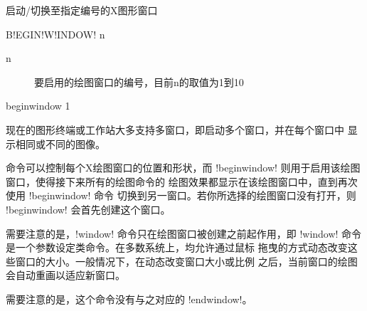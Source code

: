 \label{cmd:beginwindow}

启动/切换至指定编号的X图形窗口

\begin{SACSTX}
B!EGIN!W!INDOW! n
\end{SACSTX}

\begin{description}
\item [n] 要启用的绘图窗口的编号，目前n的取值为1到10
\end{description}

\begin{SACDFT}
beginwindow 1
\end{SACDFT}

现在的图形终端或工作站大多支持多窗口，即启动多个窗口，并在每个窗口中
显示相同或不同的图像。

 命令可以控制每个X绘图窗口的位置和形状，而
!beginwindow! 则用于启用该绘图窗口，使得接下来所有的绘图命令的
绘图效果都显示在该绘图窗口中，直到再次使用 !beginwindow! 命令
切换到另一窗口。若你所选择的绘图窗口没有打开，则 !beginwindow!
会首先创建这个窗口。

需要注意的是，!window! 命令只在绘图窗口被创建之前起作用，即
!window! 命令是一个参数设定类命令。在多数系统上，均允许通过鼠标
拖曳的方式动态改变这些窗口的大小。一般情况下，在动态改变窗口大小或比例
之后，当前窗口的绘图会自动重画以适应新窗口。

需要注意的是，这个命令没有与之对应的 !endwindow!。

